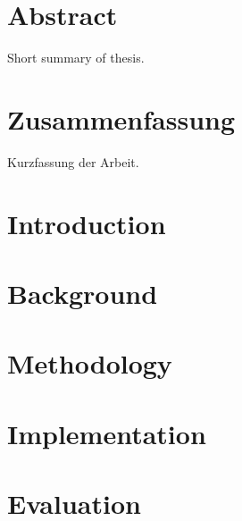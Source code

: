 \documentclass[11pt,a4paper]{book}
\begin{document}
\frontmatter


\chapter*{Abstract}
Short summary of thesis.

\chapter*{Zusammenfassung}
Kurzfassung der Arbeit.

\tableofcontents

\mainmatter
\chapter{Introduction}
\label{s:Introduction}


\chapter{Background}
\label{s:Background}


\chapter{Methodology}
\label{s:Methodology}
% 

\chapter{Implementation}
\label{s:Implementation}
% 

\chapter{Evaluation}
\label{s:Results}
% 
\end{document}
